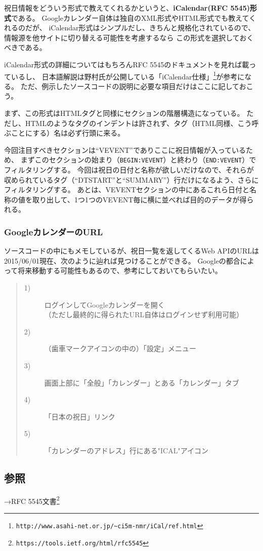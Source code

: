 祝日情報をどういう形式で教えてくれるかというと、\textbf{iCalendar(RFC 5545)形式}である。
Googleカレンダー自体は独自のXML形式やHTML形式でも教えてくれるのだが、
iCalendar形式はシンプルだし、きちんと規格化されているので、情報源を他サイトに切り替える可能性を考慮するなら
この形式を選択しておくべきである。

iCalendar形式の詳細についてはもちろんRFC 5545のドキュメントを見れば載っているし、
日本語解説は野村氏が公開している「iCalendar仕様」\footnote{\verb|http://www.asahi-net.or.jp/~ci5m-nmr/iCal/ref.html|}が参考になる。
ただ、例示したソースコードの説明に必要な項目だけはここに記しておこう。

まず、この形式はHTMLタグと同様にセクションの階層構造になっている。
ただし、HTMLのようなタグのインデントは許されず、タグ（HTML同様、こう呼ぶことにする）名は必ず行頭に来る。

今回注目すべきセクションは``VEVENT''でありここに祝日情報が入っているため、
まずこのセクションの始まり（\verb|BEGIN:VEVENT|）と終わり（\verb|END:VEVENT|）でフィルタリングする。
今回は祝日の日付と名称が欲しいだけなので、それらが収められているタグ（``DTSTART''と``SUMMARY''）行だけになるよう、さらにフィルタリングする。
あとは、VEVENTセクションの中にあるこれら日付と名称の値を取り出して、1つ1つのVEVENT毎に横に並べれば目的のデータが得られる。
\subsubsection*{GoogleカレンダーのURL}

ソースコードの中にもメモしているが、祝日一覧を返してくるWeb APIのURLは2015/06/01現在、次のように辿れば見つけることができる。
Googleの都合によって将来移動する可能性もあるので、参考にしておいてもらいたい。

\begin{quote}
\begin{description}
  \item[1)] ログインしてGoogleカレンダーを開く \\ （ただし最終的に得られたURL自体はログインせず利用可能）
  \item[2)] （歯車マークアイコンの中の）「設定」メニュー
  \item[3)] 画面上部に「全般」「カレンダー」とある「カレンダー」タブ
  \item[4)] 「日本の祝日」リンク
  \item[5)] 「カレンダーのアドレス」行にある"ICAL"アイコン
\end{description}
\end{quote}

\subsection*{参照}

\noindent
→RFC 5545文書\footnote{\verb|https://tools.ietf.org/html/rfc5545|}